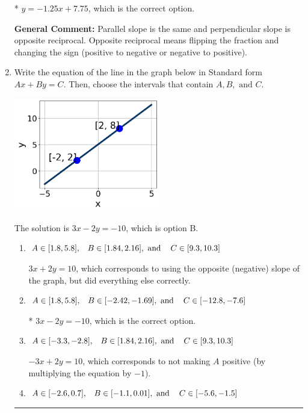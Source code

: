 \documentclass{extbook}[14pt]
\newcommand{\litem}[1]{\item #1

\rule{\textwidth}{0.4pt}}
\begin{document}
\begin{enumerate}
{\begin{enumerate}[label=\Alph*.]
* $y = -1.25x + 7.75$, which is the correct option.
\end{enumerate}

\textbf{General Comment:} Parallel slope is the same and perpendicular slope is opposite reciprocal. Opposite reciprocal means flipping the fraction and changing the sign (positive to negative or negative to positive).
}
\litem{
Write the equation of the line in the graph below in Standard form $Ax+By=C$. Then, choose the intervals that contain $A, B, \text{ and } C$.

\begin{center}
    \includegraphics[width=0.5\textwidth]{../Figures/linearGraphToStandardC.png}
\end{center}


The solution is \( 3x - 2y = -10 \), which is option B.\begin{enumerate}[label=\Alph*.]
\item \( A \in [1.8, 5.8], \hspace{3mm} B \in [1.84, 2.16], \text{ and } \hspace{3mm} C \in [9.3, 10.3] \)

 $3x + 2y = 10$, which corresponds to using the opposite (negative) slope of the graph, but did everything else correctly.
\item \( A \in [1.8, 5.8], \hspace{3mm} B \in [-2.42, -1.69], \text{ and } \hspace{3mm} C \in [-12.8, -7.6] \)

* $3x - 2y = -10$, which is the correct option.
\item \( A \in [-3.3, -2.8], \hspace{3mm} B \in [1.84, 2.16], \text{ and } \hspace{3mm} C \in [9.3, 10.3] \)

 $-3x + 2y = 10$, which corresponds to not making $A$ positive (by multiplying the equation by $-1$).
\item \( A \in [-2.6, 0.7], \hspace{3mm} B \in [-1.1, 0.01], \text{ and } \hspace{3mm} C \in [-5.6, -1.5] \)


\end{enumerate}}
\end{enumerate}
\end{document}
